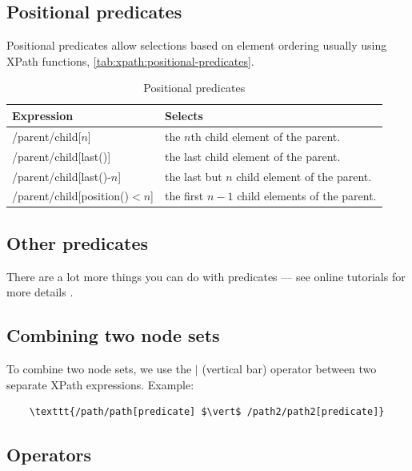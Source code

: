 \documentclass{pgnotes}
\begin{document}
\subsection{Positional predicates}

Positional predicates allow selections based on element ordering usually using XPath functions, \autoref{tab:xpath:positional-predicates}. 

\begin{table}[htbp]
  \centering
  \begin{tabularx}{1.0\linewidth}{l X}
    \toprule
    \textbf{Expression} & \textbf{Selects} \\
    \midrule
    /parent/child[$n$] & the $n$th child element of the parent. \\
    /parent/child[last()] & the last child element of the parent. \\
    /parent/child[last()-$n$] & the last but $n$ child element of the parent. \\
    /parent/child[position()$<n$] & the first $n-1$ child elements of the parent. \\
    \bottomrule
  \end{tabularx}
  \caption{Positional predicates}
  \label{tab:xpath:positional-predicates}
\end{table}

\subsection{Other predicates}

There are a lot more things you can do with predicates --- see online tutorials for more details \cite{w3-schools:2013:xpath}. 

\subsection{Combining two node sets}

To combine two node sets, we use the $\vert$ (vertical bar) operator between two separate XPath expressions.
Example: 

\begin{verbatim}
    \texttt{/path/path[predicate] $\vert$ /path2/path2[predicate]}
\end{verbatim}



\subsection{Operators}
\end{document}
